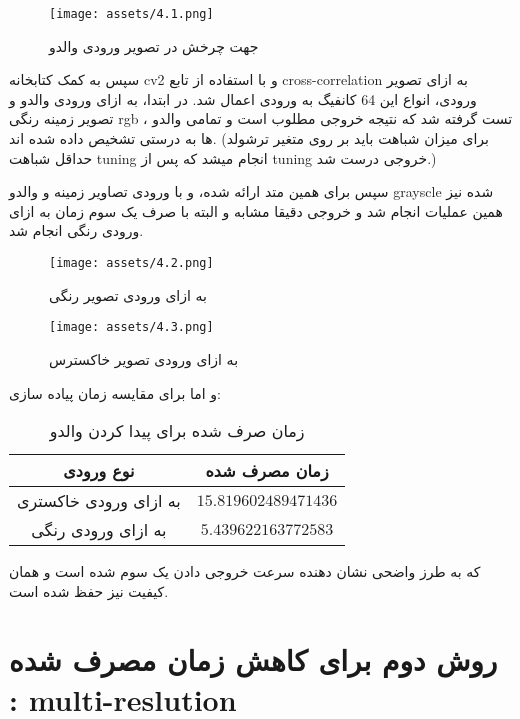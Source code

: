\documentclass[a4paper,12pt]{article}
\begin{document}
 \begin{figure}[h]
 	\centering
 	\texttt{[image: assets/4.1.png]}
 	\caption{\textcolor{CustomAccent}{جهت چرخش در تصویر ورودی والدو}}
 \end{figure}
 
 
سپس به کمک کتابخانه cv2 و با استفاده از تابع cross-correlation به ازای تصویر ورودی، انواع این 64 کانفیگ به ورودی اعمال شد.
در ابتدا، به ازای ورودی والدو و تصویر زمینه رنگی rgb ، تست گرفته شد که نتیجه خروجی مطلوب است و تمامی والدو ها به درستی تشخیص داده شده اند. (برای میزان شباهت باید بر روی متغیر ترشولد حداقل شباهت tuning انجام میشد که پس از tuning خروجی درست شد.)

سپس برای همین متد ارائه شده، و با ورودی تصاویر زمینه و والدو grayscle شده نیز همین عملیات انجام شد و خروجی دقیقا مشابه و البته با صرف یک سوم زمان به ازای ورودی رنگی انجام شد.



\begin{figure}[ht]
	\centering
	\begin{minipage}[t]{0.42\textwidth}
		\centering
		\texttt{[image: assets/4.2.png]}
		\caption{\textcolor{CustomAccent}{به ازای ورودی تصویر رنگی}}
	\end{minipage}
	\hfill
	\begin{minipage}[t]{0.42\textwidth}
		\centering
		\texttt{[image: assets/4.3.png]}
		\caption{\textcolor{CustomAccent}{به ازای ورودی تصویر خاکسترس}}
	\end{minipage}
	\vspace{1em}
\end{figure}

و اما برای مقایسه زمان پیاده سازی:
\begin{table}[h]
	\centering
	\begin{tabular}{|c|c|}
		\hline
		\textbf\textbf{نوع ورودی} & \textbf{زمان مصرف شده} \\
		\hline
		به ازای ورودی خاکستری & $15.819602489471436$ \\
		\hline
	به ازای ورودی رنگی & $5.439622163772583$ \\
		\hline
	\end{tabular}
	\caption{زمان صرف شده برای پیدا کردن والدو}
\end{table}

که به طرز واضحی نشان دهنده سرعت خروجی دادن یک سوم شده است و همان کیفیت نیز حفظ شده است. 

\section*{روش دوم برای کاهش زمان مصرف شده : multi-reslution}
\end{document}
